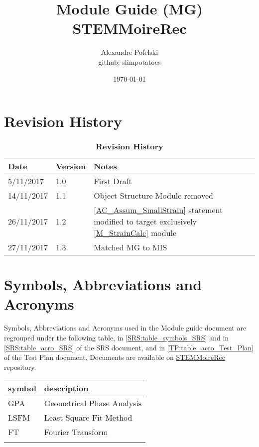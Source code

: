 \documentclass[12pt, titlepage]{article}
\newcommand{\progname}{STEMMoireRec}
\begin{document}
\title{Module Guide (MG) \\
STEMMoireRec} 
\author{Alexandre Pofelski \\
		github: slimpotatoes}
\date{\today}

\maketitle


\section{Revision History}

\begin{table}[h]
\caption{\bf Revision History}
\begin{tabularx}{\textwidth}{p{3cm}p{2cm}X}
\toprule {\bf Date} & {\bf Version} & {\bf Notes}\\
\midrule
5/11/2017 & 1.0 & First Draft\\
14/11/2017 & 1.1 & Object Structure Module removed \\
26/11/2017 & 1.2 & \cref{AC_Assum_SmallStrain} statement modified to target exclusively \cref{M_StrainCalc} module\\
27/11/2017 & 1.3 & Matched MG to MIS \\
\bottomrule
\end{tabularx}
\end{table}

\newpage
\section{Symbols, Abbreviations and Acronyms}
\label{symbols}

Symbols, Abbreviations and Acronyms used in the Module guide document are regrouped under the following table, in \cref{SRS:table_symbols_SRS} and in \cref{SRS:table_acro_SRS} of the SRS document, and in \cref{TP:table_acro_Test_Plan} of the Test Plan document. Documents are available on \href{https://github.com/slimpotatoes/STEMMoireRec}{\progname{}} repository. \par\bigskip

\renewcommand{\arraystretch}{1.2}
\begin{tabular}{l l} 
  \toprule		
  \textbf{symbol} & \textbf{description}\\
  \midrule 
  GPA & Geometrical Phase Analysis \\
  LSFM & Least Square Fit Method \\
  FT & Fourier Transform \\
  \bottomrule
  \label{table_acro_Test_Plan}
\end{tabular}
\end{document}
